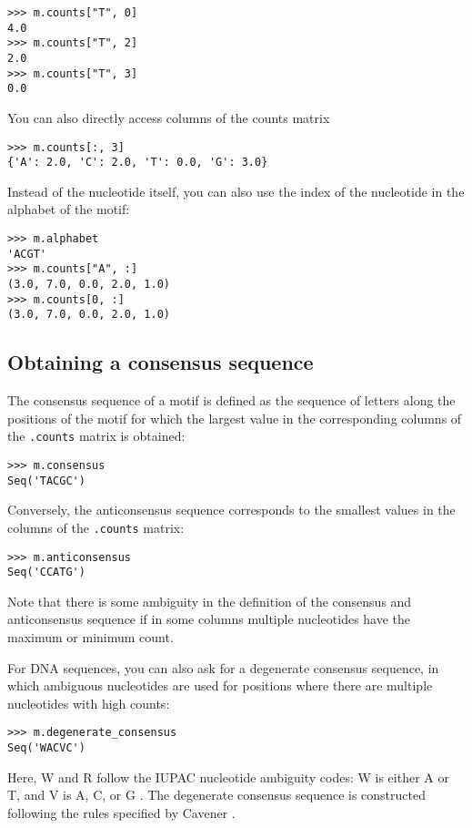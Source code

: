 \begin{verbatim}
>>> m.counts["T", 0]
4.0
>>> m.counts["T", 2]
2.0
>>> m.counts["T", 3]
0.0
\end{verbatim}
You can also directly access columns of the counts matrix
\begin{verbatim}
>>> m.counts[:, 3]
{'A': 2.0, 'C': 2.0, 'T': 0.0, 'G': 3.0}
\end{verbatim}
Instead of the nucleotide itself, you can also use the index of the nucleotide
in the alphabet of the motif:

\begin{verbatim}
>>> m.alphabet
'ACGT'
>>> m.counts["A", :]
(3.0, 7.0, 0.0, 2.0, 1.0)
>>> m.counts[0, :]
(3.0, 7.0, 0.0, 2.0, 1.0)
\end{verbatim}

\subsection{Obtaining a consensus sequence}
\label{sec:motif_consensus}

The consensus sequence of a motif is defined as the sequence of
letters along the positions of the motif for which the largest value in the
corresponding columns of the \verb+.counts+ matrix is obtained:

\begin{verbatim}
>>> m.consensus
Seq('TACGC')
\end{verbatim}
Conversely, the anticonsensus sequence corresponds to the smallest values in
the columns of the \verb+.counts+ matrix:

\begin{verbatim}
>>> m.anticonsensus
Seq('CCATG')
\end{verbatim}
Note that there is some ambiguity in the definition of the consensus and anticonsensus sequence if in some columns multiple nucleotides have the maximum or minimum count.

For DNA sequences, you can also ask for a degenerate consensus sequence, in which ambiguous nucleotides are used for positions where there are multiple nucleotides with high counts:

\begin{verbatim}
>>> m.degenerate_consensus
Seq('WACVC')
\end{verbatim}
Here, W and R follow the IUPAC nucleotide ambiguity codes: W is either A or T,
and V is A, C, or G \cite{cornish1985}. The degenerate consensus sequence is
constructed following the rules specified by Cavener \cite{cavener1987}.

